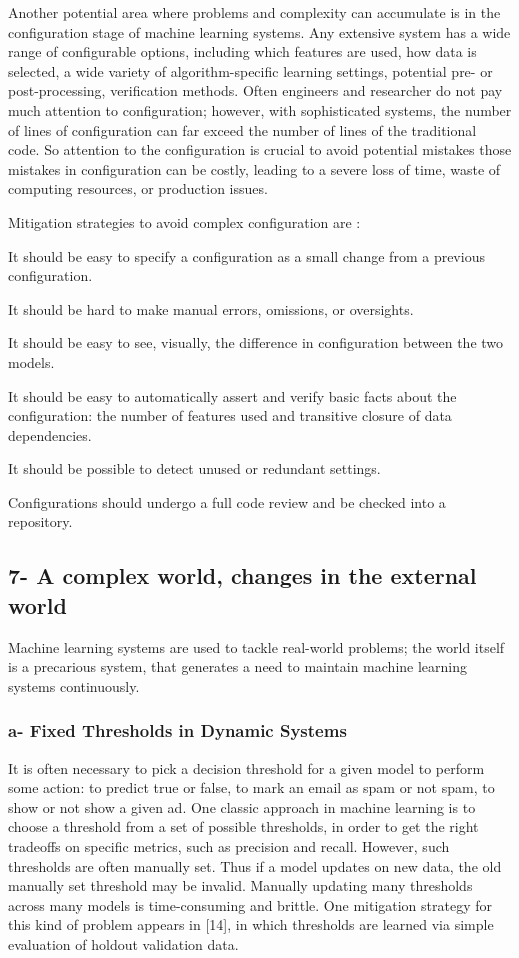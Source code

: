 \documentclass[]{article}
\begin{document}
Another potential area where problems and complexity can accumulate is
in the configuration stage of machine learning systems. Any extensive
system has a wide range of configurable options, including which
features are used, how data is selected, a wide variety of
algorithm-specific learning settings, potential pre- or post-processing,
verification methods. Often engineers and researcher do not pay much
attention to configuration; however, with sophisticated systems, the
number of lines of configuration can far exceed the number of lines of
the traditional code. So attention to the configuration is crucial to
avoid potential mistakes those mistakes in configuration can be costly,
leading to a severe loss of time, waste of computing resources, or
production issues.

Mitigation strategies to avoid complex configuration are :

It should be easy to specify a configuration as a small change from a
previous configuration.

It should be hard to make manual errors, omissions, or oversights.

It should be easy to see, visually, the difference in configuration
between the two models.

It should be easy to automatically assert and verify basic facts about
the configuration: the number of features used and transitive closure of
data dependencies.

It should be possible to detect unused or redundant settings.

Configurations should undergo a full code review and be checked into a
repository.

\subsection{7- A complex world, changes in the external
world}\label{a-complex-world-changes-in-the-external-world}

Machine learning systems are used to tackle real-world problems; the
world itself is a precarious system, that generates a need to maintain
machine learning systems continuously.

\subsubsection{a- Fixed Thresholds in Dynamic
Systems}\label{a--fixed-thresholds-in-dynamic-systems}

It is often necessary to pick a decision threshold for a given model to
perform some action: to predict true or false, to mark an email as spam
or not spam, to show or not show a given ad. One classic approach in
machine learning is to choose a threshold from a set of possible
thresholds, in order to get the right tradeoffs on specific metrics,
such as precision and recall. However, such thresholds are often
manually set. Thus if a model updates on new data, the old manually set
threshold may be invalid. Manually updating many thresholds across many
models is time-consuming and brittle. One mitigation strategy for this
kind of problem appears in {[}14{]}, in which thresholds are learned via
simple evaluation of holdout validation data.
\end{document}
